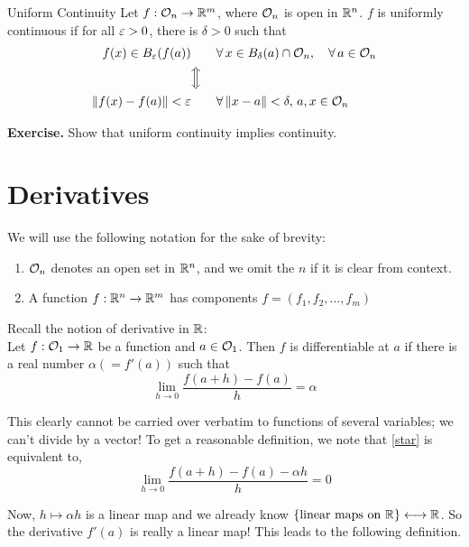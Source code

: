 \documentclass[../Analysis-3.tex]{subfiles}
\begin{document}
\begin{Def}{Uniform Continuity}{}
  Let $ f : \mathcal{O}_{n} \to \mathbb{R}^m $, where $ \mathcal{O}_{n} $ is open in $ \mathbb{R}^n $. $ f $ is uniformly continuous if for all $ \varepsilon > 0 $, there is $ \delta > 0 $ such that
  \begin{alignat*}{2}
    f(x) \in B_\varepsilon(f(a))     & \quad            &  & \forall \, x \in B_\delta(a) \cap  \mathcal{O}_{n}, \quad \forall \, a \in \mathcal{O}_{n} \\
                               & \Big\Updownarrow                                                                               \\
    \norm{f(x) - f(a)} < \varepsilon & \quad            &  & \forall \, \norm{x - a} < \delta, \, a,x \in \mathcal{O}_{n}
  \end{alignat*}
\end{Def}

\textbf{Exercise.} Show that uniform continuity implies continuity.

\section{Derivatives}

We will use the following notation for the sake of brevity:
\begin{enumerate}[label = (\arabic*)]
  \item $ \mathcal{O}_{n} $ denotes an open set in $ \mathbb{R}^n $, and we omit the $ n $ if it is clear from context.
  \item A function $ f:\mathbb{R}^n \to \mathbb{R}^m $ has components $ f = (f_1, f_2, \dots, f_m) $
\end{enumerate}
\ssk

Recall the notion of derivative in $ \mathbb{R} $: \\
Let $ f : \mathcal{O}_{1} \to \mathbb{R} $ be a function and $ a \in \mathcal{O}_{1} $. Then $ f $ is differentiable at $ a $ if there is a real number $ \alpha (= f'(a)) $ such that
\[ \lim_{h \to 0}\frac{f(a+h)-f(a)}{h} = \alpha \label{star}\tag{1} \]

This clearly cannot be carried over verbatim to functions of several variables; we can't divide by a vector! To get a reasonable definition, we note that \eqref{star} is equivalent to,
\[ \lim_{h \to 0}\frac{f(a+h)-f(a)-\alpha h}{h} = 0 \]

Now, $ h \mapsto \alpha h $ is a linear map and we already know $ \{\text{linear maps on } \mathbb{R}\} \longleftrightarrow \mathbb{R} $. So the derivative $ f'(a) $ is really a linear map! This leads to the following definition.
\end{document}

